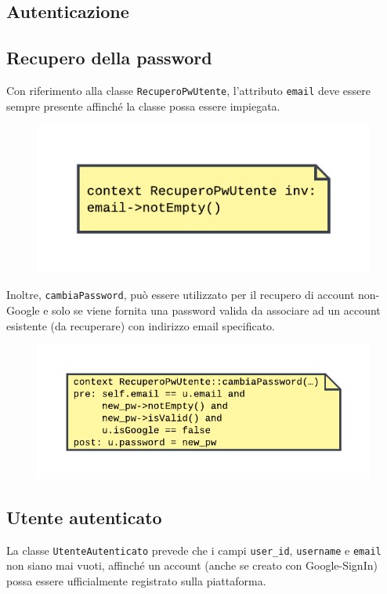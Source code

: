 \documentclass[11pt, a4paper]{article}
\theoremstyle{definition} %
\begin{document}
\subsection{Autenticazione}

\subsection{Recupero della password}
Con riferimento alla classe \texttt{RecuperoPwUtente},
l'attributo \texttt{email} deve essere sempre presente affinché la classe
possa essere impiegata.
\begin{figure}[H]
\centering
\includegraphics[scale = 1]{materiale/ocl-recuperoemail.pdf}
\end{figure}
\noindent Inoltre, \texttt{cambiaPassword}, può essere utilizzato per il
recupero di account non-Google e solo se viene fornita una password
valida da associare ad un account esistente (da recuperare) con indirizzo
email specificato.
\begin{figure}[H]
\centering
\includegraphics[scale = 0.9]{materiale/ocl-recuperopassword.pdf}
\end{figure}

\subsection{Utente autenticato}
La classe \texttt{UtenteAutenticato} prevede che i campi \texttt{user\_id},
\texttt{username} e \texttt{email} non siano mai vuoti, affinché un
account (anche se creato con Google-SignIn) possa essere ufficialmente registrato
sulla piattaforma.
\end{document}
